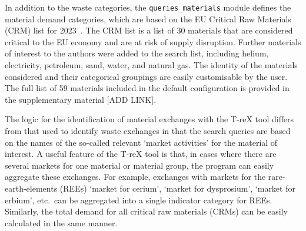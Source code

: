 In addition to the waste categories, the \texttt{queries\_materials} module defines the material demand categories, which are based on the EU Critical Raw Materials (CRM) list for 2023~\citep{eu2023crmstudy}. The CRM list is a list of 30 materials that are considered critical to the EU economy and are at risk of supply disruption. Further materials of interest to the authors were added to the search list, including helium, electricity, petroleum, sand, water, and natural gas. The identity of the materials considered and their categorical groupings are easily customisable by the user. The full list of 59 materials included in the default configuration is provided in the supplementary material [ADD LINK].

The logic for the identification of material exchanges with the T-reX tool differs from that used to identify waste exchanges in that the search queries are based on the names of the so-called relevant `market activities' for the material of interest. A useful feature of the T-reX tool is that, in cases where there are several markets for one material or material group, the program can easily aggregate these exchanges. For example, exchanges with markets for the rare-earth-elements (REEs) `market for cerium', `market for dysprosium', `market for erbium', etc.\ can be aggregated into a single indicator category for REEs. Similarly, the total demand for all critical raw materials (CRMs) can be easily calculated in the same manner. 

